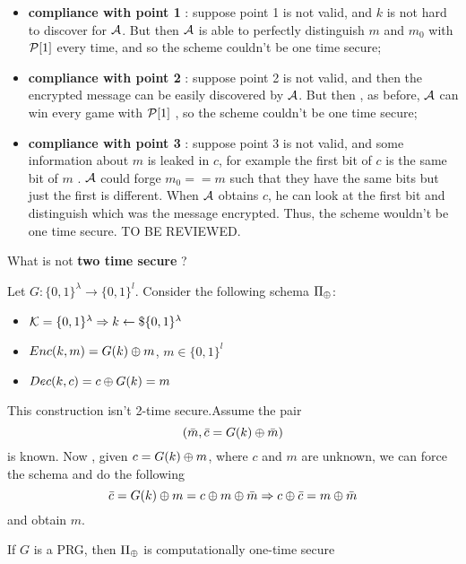 \begin{itemize}
    \item \textbf{compliance with point 1} : suppose point 1 is not valid, and
        $k$ is not hard to discover for $ \Adv $. But then $ \Adv $ is able to perfectly
        distinguish $m$ and $m_{0}$ with $ \P [ 1 ]  $ every time, and so the
        scheme couldn't be one time secure;
    \item \textbf{compliance with point 2} : suppose point 2 is not valid, and
        then the encrypted message can be easily discovered by $ \Adv $. But
        then , as before, $ \Adv $ can win every game with $ \P [ 1 ]  $ , so
        the scheme couldn't be one time secure;
    \item \textbf{compliance with point 3} : suppose point 3 is not valid, and
        some information about $m$ is leaked in $c$, for example the first bit
        of $c$ is the same bit of $m$ . $\Adv $ could forge
        $m_{0}==m$ such that they have the same bits but just the first is
        different. When $\Adv $ obtains $c$, he can look at the first bit and
        distinguish which was the message encrypted. Thus, the scheme wouldn't
        be one time secure.
        TO BE REVIEWED.
\end{itemize}
What is not \textbf{two time secure} ?
\begin{construction}
    Let $G:\{0,1\}^{\lambda} \to \{0,1\}^{l} $. Consider the following schema
    $\Pi_{\xor}$:
    \begin{itemize}
        \item $\K=\{0,1\}^{\lambda} \Rightarrow k \leftarrow\$ \{0,1\}^{\lambda}$
        \item $Enc(k,m)=G(k) \xor m$, $m \in \{0,1\}^{l}$
        \item $Dec(k,c)=c \xor G(k)=m$
    \end{itemize}
\end{construction}
This construction isn't 2-time secure.Assume the pair
\[
    ( \bar{m}, \bar{c}=G(k) \xor \bar{m}) 
\]
is known. Now , given $c=G(k) \xor m$, where $c$ and $m$ are unknown, we can
force the schema and do the following 
\[
    \bar{c}=G(k) \xor m = c \xor m \xor \bar{m} \Rightarrow c \xor \bar{c} = m
    \xor \bar{m} 
\]
 and obtain $m$.

\begin{theorem}
    If $G$ is a PRG, then $\Pi_{\xor}$ is computationally one-time secure
\end{theorem}

